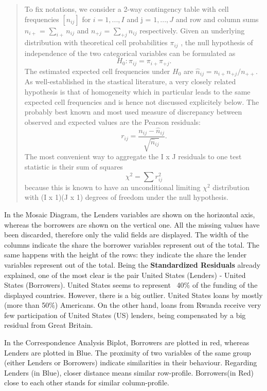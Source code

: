 \blockquote{
To fix notations, we consider a 2-way contingency table with cell frequencies $[n_{ij}]$ for $i = 1,...,I$ and j = $1,...,J$ and row and column sums $n_{i+}$ =
$\sum_{i+}{n_{ij}}$ and $n_{+j}$ = $\sum_{+j}{n_{ij}}$ respectively. Given an
underlying distribution with theoretical cell probabilities $\pi_{ij}$ , the null hypothesis of independence of the two categorical variables can be formulated as
\begin{equation}
H_{0}: \pi_{ij} = \pi_{i+}\pi_{+j}.
\end{equation}
The estimated expected cell frequencies under $H_{0}$ are $\hat{n}_{ij} = n_{i+}n_{+j}/n_{++}$. As well-established in the stastical literature, a very closely related hypothesis is that of homogeneity which in particular leads to the same expected cell frequencies and is hence not discussed explicitely below. The probably best known and most used measure of discrepancy between observed and expected values are the Pearson residuals:
\begin{equation}
r_{ij} = \frac{n_{ij} - \hat{n}_{ij}}{\sqrt{\hat{n}_{ij}}}.
\end{equation}
The most convenient way to aggregate the I x J residuals to one test statistic is their sum of squares
\begin{equation}
\chi^2 = \sum{r_{ij}^2}
\end{equation}
because this is known to have an unconditional limiting $\chi^2$ distribution with (I x 1)(J x 1) degrees of freedom under the null hypothesis.
}

In the Mosaic Diagram, the Lenders variables are shown on the horizontal axis, whereas the borrowers are shown on the vertical one. All the missing values have been discarded, therefore only the valid fields are displayed. 
The width of the columns indicate the share the borrower variables represent out of the total. The same happens with the height of the rows: they indicate the share the lender variables represent out of the total. Being the \textbf{Standardized Residuals} already explained, one of the most clear is the pair United States (Lenders) - United States (Borrowers). United States seems to represent ~40\% of the funding of the displayed countries. However, there is a big outlier. United States loans by mostly (more than 50\%) Americans. On the other hand, loans from Rwanda receive very few participation of United States (US) lenders, being compensated by a big residual from Great Britain. \par

In the Correspondence Analysis Biplot, Borrowers are plotted in red, whereas Lenders are plotted in Blue. The proximity of two variables of the same group (either Lenders or Borrowers) indicate similarities in their behaviour. Regarding Lenders (in Blue), closer distance means similar row-profile. Borrowers(in Red) close to each other stands for similar column-profile.


